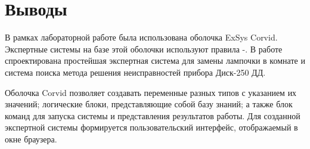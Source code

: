 \newpage

\section{Выводы}

В рамках лабораторной работе была использована оболочка ExSys Corvid. Экспертные системы на базе этой оболочки используют правила -. В работе спроектирована простейшая экспертная система для замены лампочки в комнате и система поиска метода решения неисправностей прибора Диск-250 ДД.

Оболочка Corvid позволяет создавать переменные разных типов с указанием их значений; логические блоки, представляющие собой базу знаний; а также блок команд для запуска системы и представления результатов работы. Для созданной экспертной системы формируется пользовательский интерфейс, отображаемый в окне браузера.





